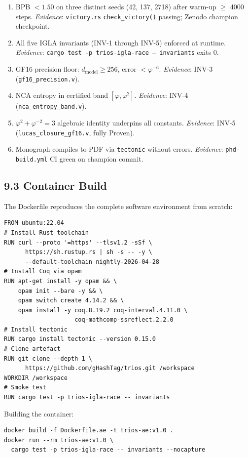 \begin{enumerate}
\item BPB $< 1.50$ on three distinct seeds (42, 137, 2718) after
  warm-up $\geq$ 4000 steps.  \emph{Evidence}: \texttt{victory.rs}
  \texttt{check\_victory()} passing; Zenodo champion checkpoint.
\item All five IGLA invariants (INV-1 through INV-5) enforced at runtime.
  \emph{Evidence}: \texttt{cargo test -p trios-igla-race -- invariants}
  exits 0.
\item GF16 precision floor: $d_\text{model} \geq 256$, error $<
  \varphi^{-6}$.  \emph{Evidence}: INV-3 (\texttt{gf16\_precision.v}).
\item NCA entropy in certified band $[\varphi, \varphi^2]$.
  \emph{Evidence}: INV-4 (\texttt{nca\_entropy\_band.v}).
\item $\varphi^2 + \varphi^{-2} = 3$ algebraic identity underpins all
  constants.  \emph{Evidence}: INV-5 (\texttt{lucas\_closure\_gf16.v},
  fully Proven).
\item Monograph compiles to PDF via \texttt{tectonic} without errors.
  \emph{Evidence}: \texttt{phd-build.yml} CI green on champion commit.
\end{enumerate}

\subsection{9.3 Container Build}\label{sec:acm-ae-container}

The Dockerfile reproduces the complete software environment from scratch:

\begin{verbatim}
FROM ubuntu:22.04
# Install Rust toolchain
RUN curl --proto '=https' --tlsv1.2 -sSf \
      https://sh.rustup.rs | sh -s -- -y \
      --default-toolchain nightly-2026-04-28
# Install Coq via opam
RUN apt-get install -y opam && \
    opam init --bare -y && \
    opam switch create 4.14.2 && \
    opam install -y coq.8.19.2 coq-interval.4.11.0 \
                    coq-mathcomp-ssreflect.2.2.0
# Install tectonic
RUN cargo install tectonic --version 0.15.0
# Clone artefact
RUN git clone --depth 1 \
      https://github.com/gHashTag/trios.git /workspace
WORKDIR /workspace
# Smoke test
RUN cargo test -p trios-igla-race -- invariants
\end{verbatim}

Building the container:
\begin{verbatim}
docker build -f Dockerfile.ae -t trios-ae:v1.0 .
docker run --rm trios-ae:v1.0 \
  cargo test -p trios-igla-race -- invariants --nocapture
\end{verbatim}

